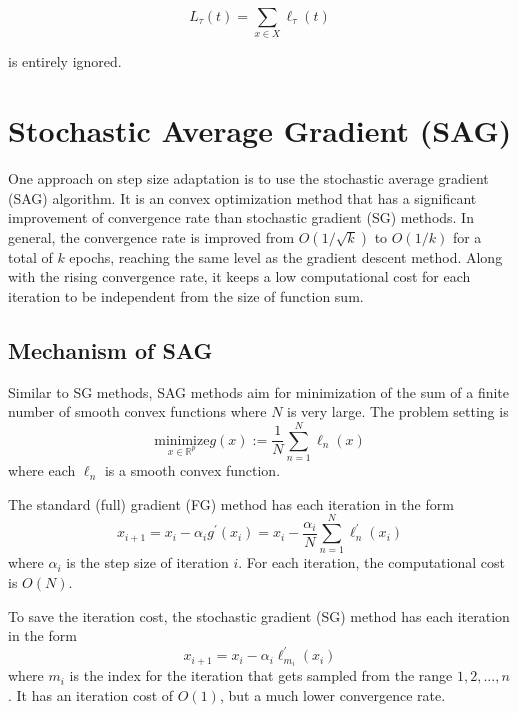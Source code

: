 \begin{equation}
    L_{\tau}(t) = \sum_{x \in X} \ell_{\tau}(t)
\end{equation}

is entirely ignored.


\graphicspath{{Figures/Smooth_func/}{./}} 


\section{Stochastic Average Gradient (SAG)}
\label{sec: sag}
One approach on step size adaptation is to use the stochastic average gradient (SAG)\cite{schmidtMinimizingFiniteSums2016} algorithm. It is an convex optimization method that has a significant improvement of convergence rate than stochastic gradient (SG) methods. In general, the convergence rate is improved from $O(1/\sqrt{k})$ to $O(1/k)$ for a total of $k$ epochs, reaching the same level as the gradient descent method. Along with the rising convergence rate, it keeps a low computational cost for each iteration to be independent from the size of function sum.

\subsection{Mechanism of SAG}
Similar to SG methods, SAG methods aim for minimization of the sum of a finite number of smooth convex functions where $N$ is very large. The problem setting is
\begin{equation}
\underset{x \in \mathbb{R}^p}{\text{minimize}} g(x) := \frac{1}{N}\sum^N_{n=1} \ell_n(x)
\end{equation}
where each $\ell_n$ is a smooth convex function.

The standard (full) gradient (FG) method has each iteration in the form
\begin{equation}
x_{i+1} = x_i - \alpha_i g^{\prime} (x_i) = x_i - \frac{\alpha_i}{N}\sum^N_{n=1} \ell_n^{\prime}(x_i)
\end{equation}
where $\alpha_i$ is the step size of iteration $i$. For each iteration, the computational cost is $O(N)$.

To save the iteration cost, the stochastic gradient (SG) method has each iteration in the form
\begin{equation}
x_{i+1} = x_i - \alpha_i \ell_{m_i}^{\prime} (x_i)
\end{equation}
where $m_i$ is the index for the iteration that gets sampled from the range {$1, 2,...,n$}. It has an iteration cost of $O(1)$, but a much lower convergence rate.

